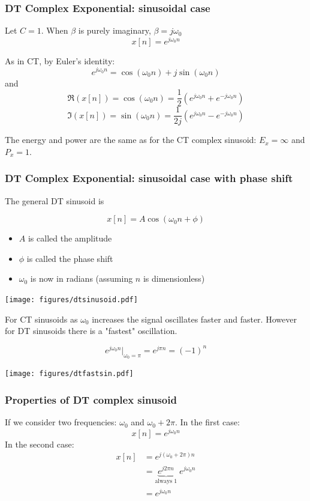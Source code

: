 \subsubsection{DT Complex Exponential: sinusoidal case}

Let $C = 1$. When $\beta$ is purely imaginary, $\beta = j\omega_0$
\[
x[n] = e^{j\omega_0 n}
\]

As in CT, by Euler's identity:
\[
e^{j\omega_0 n} = \cos(\omega_0 n) + j\sin(\omega_0 n)
\]
and
\[
\Re(x[n]) = \cos(\omega_0 n) = \frac{1}{2}\left( e^{j\omega_0 n} + e^{-j\omega_0 n} \right)
\]
\[
\Im(x[n]) = \sin(\omega_0 n) = \frac{1}{2j}\left( e^{j\omega_0 n} - e^{-j\omega_0 n} \right)
\]

The energy and power are the same as for the CT complex sinusoid: $E_x = \infty$ and $P_x = 1$.


\subsubsection{DT Complex Exponential: sinusoidal case with phase shift}

The general DT sinusoid is

\[
x[n] = A\cos(\omega_0 n + \phi)
\]

\begin{itemize}
\item $A$ is called the amplitude
\item $\phi$ is called the phase shift
\item $\omega_0$ is now in radians (assuming $n$ is dimensionless)
\end{itemize}

\begin{center}
\texttt{[image: figures/dtsinusoid.pdf]}
\end{center}

For CT sinusoids as $\omega_0$ increases the signal oscillates faster and faster. However for DT sinusoids there is a "fastest" oscillation.

\[
e^{j\omega_0 n}\rvert_{\omega_0 = \pi} = e^{j\pi n} = (-1)^n
\]

\texttt{[image: figures/dtfastsin.pdf]}

\subsubsection{Properties of DT complex sinusoid}

If we consider two frequencies: $\omega_0$ and $\omega_0+2\pi$. In the first case:
\[
x[n] = e^{j\omega_0 n}
\]
In the second case:
\[
\begin{array}{ll}
x[n] &= e^{j(\omega_0+2\pi) n} \\
&= \underbrace{e^{j2\pi n}}_{\text{always 1}}\; e^{j\omega_0 n} \\
&= e^{j\omega_0 n}
\end{array}
\]

